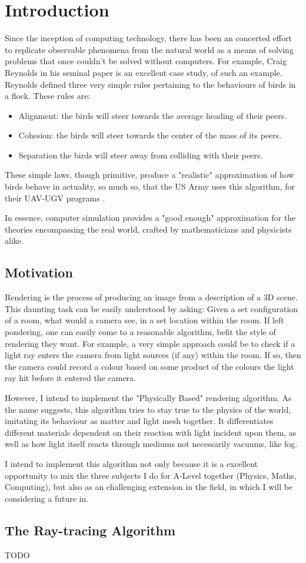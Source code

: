 \documentclass[../main.tex]{subfiles}
\begin{document}
\section{Introduction}
Since the inception of computing technology, there has been an concerted effort to replicate observable phenomena from the natural world as a means of solving problems that once couldn't be solved without computers.
\newline
For example, Craig Reynolds in his seminal paper \cite{reynoldsFlocksHerdsSchools1987} is an excellent case study, of such an example. Reynolds defined three very simple rules pertaining to the behaviours of birds in a flock. These rules are: 
\begin{itemize}
  \item Alignment: the birds will steer towards the average heading of their peers.
  \item Cohesion: the birds will steer towards the center of the mass of its peers.  
  \item Separation the birds will steer away from colliding with their peers.
\end{itemize}
These simple laws, though primitive, produce a "realistic" approximation of how birds behave in actuality, so much so, that the US Army uses this algorithm, for their UAV-UGV programs \cite{saskaCoordinationNavigationHeterogeneous2014}.

In essence, computer simulation provides a "good enough" approximation for the theories encompassing the real world, crafted by mathematicians and physicists alike.
\subsection{Motivation}
Rendering is the process of producing an image from a description of a 3D scene. This daunting task can be easily understood by asking: Given a set configuration of a room, what would a camera see, in a set location within the room. 
If left pondering, one can easily come to a reasonable algorithm, befit the style of rendering they want. For example, a very simple approach could be to check if a light ray enters the camera from light sources (if any) within the room. If so, then the camera could record a colour based on some product of the colours the light ray hit before it entered the camera. 

However, I intend to implement the "Physically Based" rendering algorithm.
As the name suggests, this algorithm tries to stay true to the physics of the world, imitating its behaviour as matter and light mesh together. It differentiates different materials dependent on their reaction with light incident upon them, as well as how light itself reacts through mediums not necessarily vacuums, like fog. 

I intend to implement this algorithm not only because it is a excellent opportunity to mix the three subjects I do for A-Level together (Physics, Maths, Computing), but also as an challenging extension in the field, in which I will be considering a future in.
\subsection{The Ray-tracing Algorithm}
TODO

\end{document}
